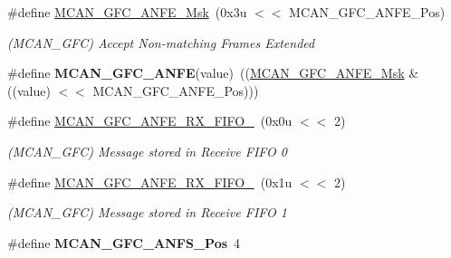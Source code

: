 \begin{DoxyCompactItemize}
\item 
\mbox{\label{group__SAMV71__MCAN_gaecfca3fbc83ce91d1c4bfe69bf669a47}} 
\#define \mbox{\hyperlink{group__SAMV71__MCAN_gaecfca3fbc83ce91d1c4bfe69bf669a47}{M\+C\+A\+N\+\_\+\+G\+F\+C\+\_\+\+A\+N\+F\+E\+\_\+\+Msk}}~(0x3u $<$$<$ M\+C\+A\+N\+\_\+\+G\+F\+C\+\_\+\+A\+N\+F\+E\+\_\+\+Pos)
\begin{DoxyCompactList}\small\item\em (M\+C\+A\+N\+\_\+\+G\+FC) Accept Non-\/matching Frames Extended \end{DoxyCompactList}\item 
\mbox{\label{group__SAMV71__MCAN_ga20ac52d3ae84921682d39465d271eacb}} 
\#define {\bfseries M\+C\+A\+N\+\_\+\+G\+F\+C\+\_\+\+A\+N\+FE}(value)~((\mbox{\hyperlink{group__SAMV71__MCAN_gaecfca3fbc83ce91d1c4bfe69bf669a47}{M\+C\+A\+N\+\_\+\+G\+F\+C\+\_\+\+A\+N\+F\+E\+\_\+\+Msk}} \& ((value) $<$$<$ M\+C\+A\+N\+\_\+\+G\+F\+C\+\_\+\+A\+N\+F\+E\+\_\+\+Pos)))
\item 
\mbox{\label{group__SAMV71__MCAN_gab95a6af22d1c094c6c31230bbc0e5102}} 
\#define \mbox{\hyperlink{group__SAMV71__MCAN_gab95a6af22d1c094c6c31230bbc0e5102}{M\+C\+A\+N\+\_\+\+G\+F\+C\+\_\+\+A\+N\+F\+E\+\_\+\+R\+X\+\_\+\+F\+I\+F\+O\+\_}}~(0x0u $<$$<$ 2)
\begin{DoxyCompactList}\small\item\em (M\+C\+A\+N\+\_\+\+G\+FC) Message stored in Receive F\+I\+FO 0 \end{DoxyCompactList}\item 
\mbox{\label{group__SAMV71__MCAN_ga14fa270466065df4811e54997ffa8b07}} 
\#define \mbox{\hyperlink{group__SAMV71__MCAN_ga14fa270466065df4811e54997ffa8b07}{M\+C\+A\+N\+\_\+\+G\+F\+C\+\_\+\+A\+N\+F\+E\+\_\+\+R\+X\+\_\+\+F\+I\+F\+O\+\_}}~(0x1u $<$$<$ 2)
\begin{DoxyCompactList}\small\item\em (M\+C\+A\+N\+\_\+\+G\+FC) Message stored in Receive F\+I\+FO 1 \end{DoxyCompactList}\item 
\mbox{\label{group__SAMV71__MCAN_ga7ea2457c1207d21da7e634419903041b}} 
\#define {\bfseries M\+C\+A\+N\+\_\+\+G\+F\+C\+\_\+\+A\+N\+F\+S\+\_\+\+Pos}~4
\item 

\end{DoxyCompactItemize}
